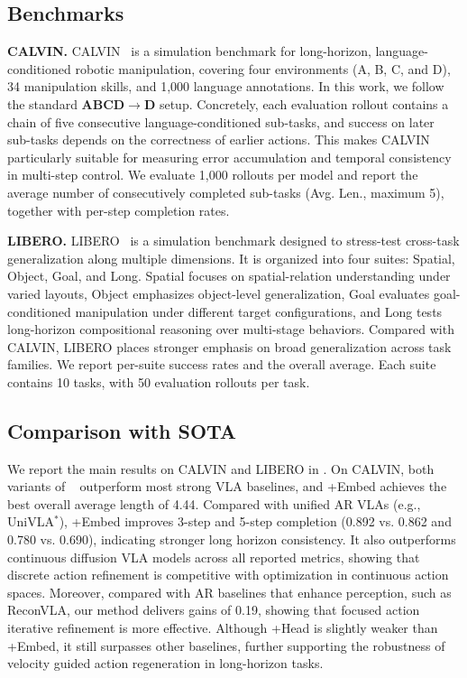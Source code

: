 \subsection{Benchmarks}
\label{sec:benchmark}
\textbf{CALVIN.}
CALVIN~\citep{mees2022calvin} is a simulation benchmark for long-horizon, language-conditioned robotic manipulation, covering four environments (A, B, C, and D), 34 manipulation skills, and 1,000 language annotations. In this work, we follow the standard \textbf{ABCD$\rightarrow$D} setup. Concretely, each evaluation rollout contains a chain of five consecutive language-conditioned sub-tasks, and success on later sub-tasks depends on the correctness of earlier actions. This makes CALVIN particularly suitable for measuring error accumulation and temporal consistency in multi-step control. We evaluate 1,000 rollouts per model and report the average number of consecutively completed sub-tasks (Avg. Len., maximum 5), together with per-step completion rates.

\noindent
\textbf{LIBERO.}
LIBERO~\citep{liu2023libero} is a simulation benchmark designed to stress-test cross-task generalization along multiple dimensions. It is organized into four suites: Spatial, Object, Goal, and Long. Spatial focuses on spatial-relation understanding under varied layouts, Object emphasizes object-level generalization, Goal evaluates goal-conditioned manipulation under different target configurations, and Long tests long-horizon compositional reasoning over multi-stage behaviors. Compared with CALVIN, LIBERO places stronger emphasis on broad generalization across task families. We report per-suite success rates and the overall average. Each suite contains 10 tasks, with 50 evaluation rollouts per task.

\subsection{Comparison with SOTA}
\label{sec:sota}


We report the main results on CALVIN and LIBERO in . On CALVIN, both variants of \method~ outperform most strong VLA baselines, and \method+Embed achieves the best overall average length of 4.44. 
Compared with unified AR VLAs (e.g., UniVLA$^{*}$), \method+Embed improves 3-step and 5-step completion (0.892 vs. 0.862 and 0.780 vs. 0.690), indicating stronger long horizon consistency. It also outperforms continuous diffusion VLA models across all reported metrics, showing that discrete action refinement is competitive with optimization in continuous action spaces. Moreover, compared with AR baselines that enhance perception, such as ReconVLA, our method delivers gains of 0.19, showing that focused action iterative refinement is more effective. 
Although \method+Head is slightly weaker than \method+Embed, it still surpasses other baselines, further supporting the robustness of velocity guided action regeneration in long-horizon tasks.


